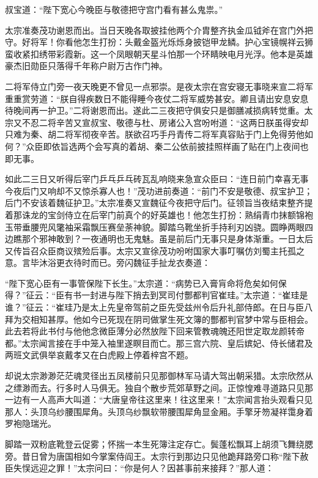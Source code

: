 \documentclass[12pt,UTF8]{ctexbook}
\begin{document}
{叔宝道：“陛下宽心今晚臣与敬德把守宫门看有甚么鬼祟。”

太宗准奏茂功谢恩而出。当日天晚各取披挂他两个介胄整齐执金瓜钺斧在宫门外把守。好将军！你看他怎生打扮：头戴金盔光烁烁身披铠甲龙鳞。护心宝镜幌祥云狮蛮收紧扣绣带彩霞新。这一个凤眼朝天星斗怕那一个环睛映电月光浮。他本是英雄豪杰旧勋臣只落得千年称户尉万古作门神。

二将军侍立门旁一夜天晚更不曾见一点邪崇。是夜太宗在宫安寝无事晓来宣二将军重重赏劳道：“朕自得疾数日不能得睡今夜仗二将军威势甚安。卿且请出安息安息待晚间再一护卫。”二将谢恩而出。遂此二三夜把守俱安只是御膳减损病转觉重。太宗又不忍二将辛苦又宣叔宝、敬德与杜、房诸公入宫吩咐道：“这两日朕虽得安却只难为秦、胡二将军彻夜辛苦。朕欲召巧手丹青传二将军真容贴于门上免得劳他如何？”众臣即依旨选两个会写真的着胡、秦二公依前披挂照样画了贴在门上夜间也即无事。

如此二三日又听得后宰门乒乓乒乓砖瓦乱响晓来急宣众臣曰：“连日前门幸喜无事今夜后门又响却不又惊杀寡人也！”茂功进前奏道：“前门不安是敬德、叔宝护卫；后门不安该着魏征护卫。”太宗准奏又宣魏征今夜把守后门。征领旨当夜结束整齐提着那诛龙的宝剑侍立在后宰门前真个的好英雄也！他怎生打扮：熟绢青巾抹额锦袍玉带垂腰兜风氅袖采霜飘压赛垒荼神貌。脚踏乌靴坐折手持利刃凶骁。圆睁两眼四边瞧那个邪神敢到？一夜通明也无鬼魅。虽是前后门无事只是身体渐重。一日太后又传旨召众臣商议殡殓后事。太宗又宣徐茂功吩咐国家大事叮嘱仿刘蜀主托孤之意。言毕沐浴更衣待时而已。旁闪魏征手扯龙衣奏道：

“陛下宽心臣有一事管保陛下长生。”太宗道：“病势已入膏肓命将危矣如何保得？”征云：“臣有书一封进与陛下捎去到冥司付酆都判官崔珪。”太宗道：“崔珪是谁？”征云：“崔珪乃是太上先皇帝驾前之臣先受兹州令后升礼部侍郎。在日与臣八拜为交相知甚厚。他如今已死现在阴司做掌生死文簿的酆都判官梦中常与臣相会。此去若将此书付与他他念微臣薄分必然放陛下回来管教魂魄还阳世定取龙颜转帝都。”太宗闻言接在手中笼入袖里遂瞑目而亡。那三宫六院、皇后嫔妃、侍长储君及两班文武俱举哀戴孝又在白虎殿上停着梓宫不题。

却说太宗渺渺茫茫魂灵径出五凤楼前只见那御林军马请大驾出朝采猎。太宗欣然从之缥渺而去。行多时人马俱无。独自个散步荒郊草野之间。正惊惶难寻道路只见那一边有一人高声大叫道：“大唐皇帝往这里来！往这里来！”太宗闻言抬头观看只见那人：头顶乌纱腰围犀角。头顶乌纱飘软带腰围犀角显金厢。手擎牙笏凝祥霭身着罗袍隐瑞光。

脚踏一双粉底靴登云促雾；怀揣一本生死簿注定存亡。鬓蓬松飘耳上胡须飞舞绕腮旁。昔日曾为唐国相如今掌案侍阎王。太宗行到那边只见他跪拜路旁口称“陛下赦臣失悮远迎之罪！”太宗问曰：“你是何人？因甚事前来接拜？”那人道：

}
\end{document}
